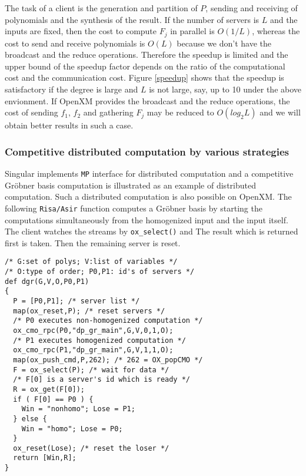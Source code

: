 The task of a client is the generation and partition of $P$, sending
and receiving of polynomials and the synthesis of the result. If the
number of servers is $L$ and the inputs are fixed, then the cost to
compute $F_j$ in parallel is $O(1/L)$, whereas the cost
to send and receive polynomials is $O(L)$
because we don't have the broadcast and the reduce
operations. Therefore the speedup is limited and the upper bound of
the speedup factor depends on the ratio of 
the computational cost and the communication cost.
Figure \ref{speedup} shows that 
the speedup is satisfactory if the degree is large and $L$
is not large, say, up to 10 under the above envionment.
If OpenXM provides the broadcast and the reduce operations, the cost of 
sending $f_1$, $f_2$ and gathering $F_j$ may be reduced to $O(log_2L)$
and we will obtain better results in such a case.

\subsubsection{Competitive distributed computation by various strategies}

Singular \cite{Singular} implements {\tt MP} interface for distributed
computation and a competitive Gr\"obner basis computation is
illustrated as an example of distributed computation.
Such a distributed computation is also possible on OpenXM.
The following {\tt Risa/Asir} function computes a Gr\"obner basis by
starting the computations simultaneously from the homogenized input and
the input itself.  The client watches the streams by {\tt ox\_select()}
and The result which is returned first is taken. Then the remaining
server is reset.

\begin{verbatim}
/* G:set of polys; V:list of variables */
/* O:type of order; P0,P1: id's of servers */
def dgr(G,V,O,P0,P1)
{
  P = [P0,P1]; /* server list */
  map(ox_reset,P); /* reset servers */
  /* P0 executes non-homogenized computation */
  ox_cmo_rpc(P0,"dp_gr_main",G,V,0,1,O);
  /* P1 executes homogenized computation */
  ox_cmo_rpc(P1,"dp_gr_main",G,V,1,1,O);
  map(ox_push_cmd,P,262); /* 262 = OX_popCMO */
  F = ox_select(P); /* wait for data */
  /* F[0] is a server's id which is ready */
  R = ox_get(F[0]);
  if ( F[0] == P0 ) {
    Win = "nonhomo"; Lose = P1;
  } else {
    Win = "homo"; Lose = P0;
  }
  ox_reset(Lose); /* reset the loser */
  return [Win,R];
}
\end{verbatim}
